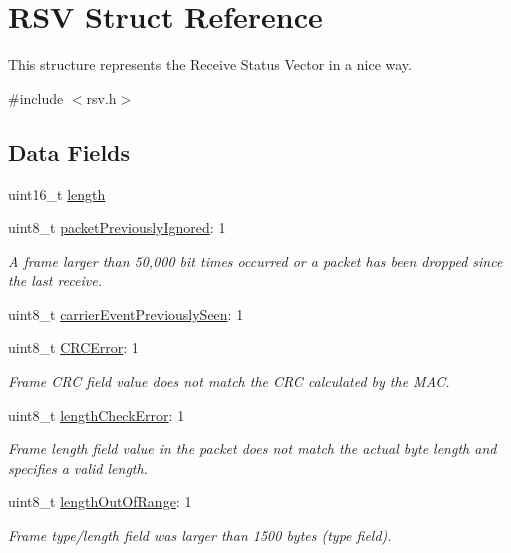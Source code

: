 \hypertarget{struct_r_s_v}{}\section{R\+SV Struct Reference}
\label{struct_r_s_v}


This structure represents the Receive Status Vector in a nice way.  




{\ttfamily \#include $<$rsv.\+h$>$}

\subsection*{Data Fields}
\begin{DoxyCompactItemize}
\item 
uint16\+\_\+t \mbox{\hyperlink{struct_r_s_v_a1892eba2086d12ac2b09005aeb09ea3b}{length}}
\item 
uint8\+\_\+t \mbox{\hyperlink{struct_r_s_v_a91c26b9645e5edca1e4c4f13c76631a2}{packet\+Previously\+Ignored}}\+: 1
\begin{DoxyCompactList}\small\item\em A frame larger than 50,000 bit times occurred or a packet has been dropped since the last receive. \end{DoxyCompactList}\item 
uint8\+\_\+t \mbox{\hyperlink{struct_r_s_v_a009a3b631b303f95d25e18876d2bcf6c}{carrier\+Event\+Previously\+Seen}}\+: 1
\item 
uint8\+\_\+t \mbox{\hyperlink{struct_r_s_v_a331925f67a8efb3a251601448de7b1eb}{C\+R\+C\+Error}}\+: 1
\begin{DoxyCompactList}\small\item\em Frame C\+RC field value does not match the C\+RC calculated by the M\+AC. \end{DoxyCompactList}\item 
uint8\+\_\+t \mbox{\hyperlink{struct_r_s_v_aa1ee2560cad39e2579609aa0bbe23622}{length\+Check\+Error}}\+: 1
\begin{DoxyCompactList}\small\item\em Frame length field value in the packet does not match the actual byte length and specifies a valid length. \end{DoxyCompactList}\item 
uint8\+\_\+t \mbox{\hyperlink{struct_r_s_v_addceef1c25a3a79f0809d2088d7fad31}{length\+Out\+Of\+Range}}\+: 1
\begin{DoxyCompactList}\small\item\em Frame type/length field was larger than 1500 bytes (type field). \end{DoxyCompactList}\item 

\end{DoxyCompactItemize}
